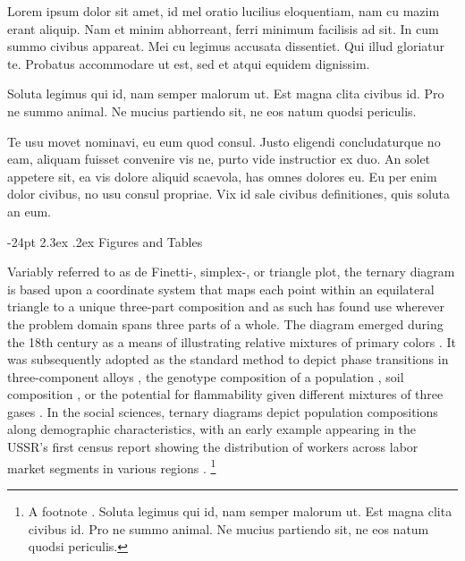 \documentclass[10pt,twoside,reqno]{article}
\makeatletter
\renewcommand\section{\@startsection {section}{1}{\z@}%
                                   {-24pt}%
                                   {2.3ex \@plus.2ex}%
                                   {\normalfont\large\bfseries}}
\let\oldfootnote\footnote
\renewcommand\footnote[1]{%
\oldfootnote{\hspace{0.6mm}#1}}
\makeatother
\begin{document}
Lorem ipsum dolor sit amet, id mel oratio lucilius eloquentiam, nam cu mazim erant aliquip. Nam et minim abhorreant, ferri minimum facilisis ad sit. In cum summo civibus appareat. Mei cu legimus accusata dissentiet. Qui illud gloriatur te. Probatus accommodare ut est, sed et atqui equidem dignissim.

Soluta legimus qui id, nam semper malorum ut. Est magna clita civibus id. Pro ne summo animal. Ne mucius partiendo sit, ne eos natum quodsi periculis.

Te usu movet nominavi, eu eum quod consul. Justo eligendi concludaturque no eam, aliquam fuisset convenire vis ne, purto vide instructior ex duo. An solet appetere sit, ea vis dolore aliquid scaevola, has omnes dolores eu. Eu per enim dolor civibus, no usu consul propriae. Vix id sale civibus definitiones, quis soluta an eum.

\hypertarget{figures-and-tables}{%
\section{Figures and Tables}\label{figures-and-tables}}

Variably referred to as de Finetti-, simplex-, or triangle plot, the ternary diagram is based upon a coordinate system that maps each point within an equilateral triangle to a unique three-part composition and as such has found use wherever the problem domain spans three parts of a whole. The diagram emerged during the 18th century as a means of illustrating relative mixtures of primary colors \citep{Howarth1996}. It was subsequently adopted as the standard method to depict phase transitions in three-component alloys \citep{Bancroft1897}, the genotype composition of a population \citep{DeFinetti1926}, soil composition \citep{Davis1927}, or the potential for flammability given different mixtures of three gases \citep{Zabetakis1965}. In the social sciences, ternary diagrams depict population compositions along demographic characteristics, with an early example appearing in the USSR's first census report showing the distribution of workers across labor market segments in various regions \citep{Kvitkin1932}.\footnote{A footnote \citep{Ware2013, Denil2015}. Soluta legimus qui id, nam semper malorum ut. Est magna clita civibus id. Pro ne summo animal. Ne mucius partiendo sit, ne eos natum quodsi periculis.}
\end{document}
